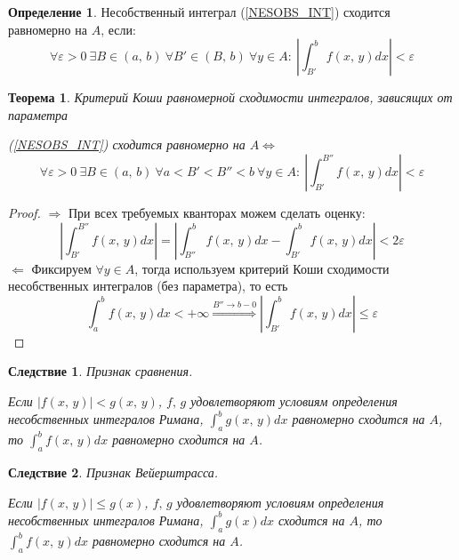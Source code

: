 \documentclass[a4paper,12pt]{article}
\renewcommand{\leq}{\ensuremath{\leqslant}}
\theoremstyle{plain}
\newtheorem{theorem}{Теорема}[section]
\newtheorem*{corollary}{Следствие}
\theoremstyle{definition}
\newtheorem{definition}{Определение}[section]
\theoremstyle{remark}
\begin{document}
\begin{definition}
	Несобственный интеграл (\ref{NESOBS_INT}) сходится равномерно на $A$, если:
	\[\forall \varepsilon > 0 \: \exists B \in (a,\,b) \: \forall B' \in (B,\,b) \: \forall y \in A :\: \left|\int_{B'}^b f(x,\,y)dx\right| < \varepsilon\]
\end{definition}

\begin{theorem}
	Критерий Коши равномерной сходимости интегралов, зависящих от параметра

	(\ref{NESOBS_INT}) сходится равномерно на $A \Leftrightarrow$
	\[\forall \varepsilon > 0 \: \exists B \in (a,\,b) \: \forall a < B' < B''< b \: \forall y \in A :\: \left|\int_{B'}^{B''}f(x,\,y)dx\right| < \varepsilon\]
\end{theorem}

\begin{proof}
	$\Rightarrow$ При всех требуемых кванторах можем сделать оценку:
	\[\left|\int_{B'}^{B''}f(x,\,y)dx\right| = \left|\int_{B''}^b f(x,\,y)dx - \int_{B'}^bf(x,\,y)dx\right| < 2\varepsilon\]
	$\Leftarrow$ Фиксируем $\forall y \in A$, тогда используем критерий Коши сходимости несобственных интегралов (без параметра), то есть
	\[\int_a^b f(x,\,y)dx < +\infty \stackrel{B'' \to b - 0}{\Rightarrow} \left|\int_{B'}^{b}f(x,\,y)dx\right| \leq \varepsilon\]
\end{proof}

\begin{corollary}
	Признак сравнения.

	Если $|f(x,\,y)| < g(x,\,y)$, $f,\,g$ удовлетворяют условиям определения несобственных интегралов Римана, $\int_a^b g(x,\,y)dx$ равномерно сходится на $A$, то $\int_a^b f(x,\,y)dx$ равномерно сходится на $A$.
\end{corollary}

\begin{corollary}
	Признак Вейерштрасса.

	Если $|f(x,\,y)| \leq g(x)$, $f,\,g$ удовлетворяют условиям определения несобственных интегралов Римана, $\int_a^b g(x)dx$ сходится на $A$, то $\int_a^b f(x,\,y)dx$ равномерно сходится на $A$.
\end{corollary}
\end{document}
